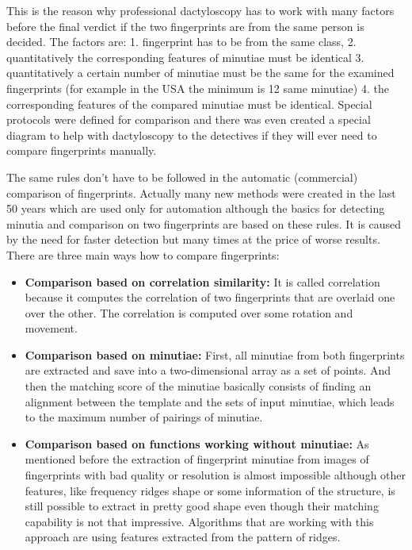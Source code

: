 This is the reason why professional dactyloscopy has to work with many factors before the final verdict if the two fingerprints are from the same person is decided. The factors are: 1. fingerprint has to be from the same class, 2. quantitatively the corresponding features of minutiae must be identical 3. quantitatively a certain number of minutiae must be the same for the examined fingerprints (for example in the USA the minimum is 12 same minutiae) 4. the corresponding features of the compared minutiae must be identical. Special protocols were defined for comparison and there was even created a special diagram to help with dactyloscopy to the detectives if they will ever need to compare fingerprints manually.\cite{maltoni2009handbook}  

The same rules don’t have to be followed in the automatic (commercial) comparison of fingerprints. Actually many new methods were created in the last 50 years which are used only for automation although the basics for detecting minutia and comparison on two fingerprints are based on these rules. It is caused by the need for faster detection but many times at the price of worse results. There are three main ways how to compare fingerprints: \cite{jain2007handbook}\cite{maltoni2009handbook}

\begin{itemize}
	\item \textbf{Comparison based on correlation similarity:} 
	It is called correlation because it computes the correlation of two fingerprints that are overlaid one over the other. The correlation is computed over some rotation and movement.\cite{jain2007handbook}\cite{maltoni2009handbook}
	
	\item\textbf{Comparison based on minutiae:}
	First, all minutiae from both fingerprints are extracted and save into a two-dimensional array as a set of points. And then the matching score of the minutiae basically consists of finding an alignment between the template and the sets of input minutiae, which leads to the maximum number of pairings of minutiae.\cite{jain2007handbook}\cite{maltoni2009handbook}

	\item \textbf{Comparison based on functions working without minutiae:}
	As mentioned before the extraction of fingerprint minutiae from images of fingerprints with bad quality or resolution is almost impossible although other features, like frequency ridges shape or some information of the structure, is still possible to extract in pretty good shape even though their matching capability is not that impressive. Algorithms that are working with this approach are using features extracted from the pattern of ridges.\cite{jain2007handbook}\cite{maltoni2009handbook}
\end{itemize}

